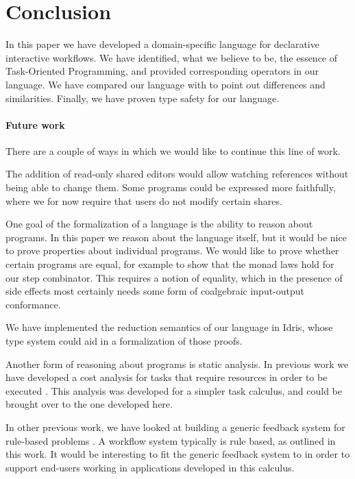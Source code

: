 
\section{Conclusion}

In this paper we have developed a domain-specific language for declarative interactive workflows.
We have identified, what we believe to be, the essence of Task-Oriented Programming, and provided corresponding operators in our language.
We have compared our language with \CSP to point out differences and similarities.
Finally, we have proven type safety for our language.

\paragraph{Future work}

There are a couple of ways in which we would like to continue this line of work.

The addition of read-only shared editors would allow watching references without being able to change them.
Some programs could be expressed more faithfully, where we for now require that users do not modify certain shares.

One goal of the formalization of a language is the ability to reason about programs.
In this paper we reason about the language itself, but it would be nice to prove properties about individual programs.
We would like to prove whether certain programs are equal, for example to show that the monad laws hold for our step combinator.
This requires a notion of equality, which in the presence of side effects most certainly needs some form of coalgebraic input-output conformance.

We have implemented the reduction semantics of our language in Idris, whose type system could aid in a formalization of those proofs.

Another form of reasoning about programs is static analysis.
In previous work we have developed a cost analysis for tasks that require resources in order to be executed \cite{conf/ifl/KlinikJP17}.
This analysis was developed for a simpler task calculus, and could be brought over to the one developed here.

In other previous work, we have looked at building a generic feedback system for
rule-based problems \cite{UUCS2017013}. A workflow system typically is rule
based, as outlined in this work. It would be interesting to fit the generic
feedback system to \TOPHAT in order to support end-users working in applications
developed in this calculus.



